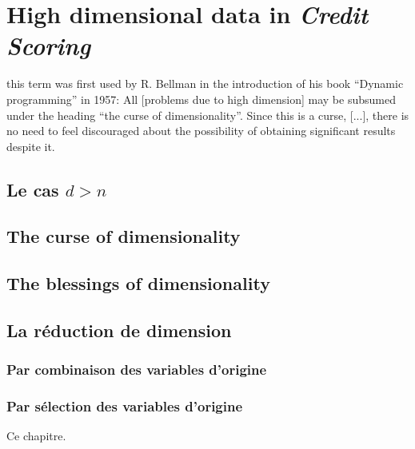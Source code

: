 \chapter{High dimensional data in \textit{Credit Scoring}} \label{chap7}



this term was first used by R. Bellman in the introduction of his book
“Dynamic programming” in 1957:
All [problems due to high dimension] may be subsumed under the
heading “the curse of dimensionality”. Since this is a curse, [...], there is
no need to feel discouraged about the possibility of obtaining significant
results despite it.
















\section{Le cas $d > n$}


\section{The curse of dimensionality}


\section{The blessings of dimensionality}


\section{La réduction de dimension}


\subsection{Par combinaison des variables d'origine}

\subsection{Par sélection des variables d'origine}


\bigskip

Ce chapitre.


\printbibliography[heading=subbibliography, title=Références du chapitre 6]